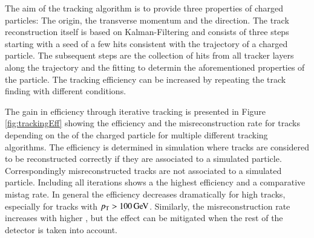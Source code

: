 The aim of the tracking algorithm is to provide three properties of charged particles: The origin, the transverse momentum and the direction.
The track reconstruction itself is based on Kalman-Filtering \cite{Adam:934067} and consists of three steps starting with a seed of a few hits consistent with the trajectory of a charged particle.
The subsequent steps are the collection of hits from all tracker layers along the trajectory and the fitting to determin the aforementioned properties of the particle.
The tracking efficiency can be increased by repeating the track finding with different conditions.

The gain in efficiency through iterative tracking is presented in Figure \ref{fig:trackingEff} showing the efficiency and the misreconstruction rate for tracks depending on the \pt of the charged particle for 
multiple different tracking algorithms. The efficiency is determined in simulation where tracks are considered to be reconstructed correctly if they are associated to a simulated particle. Correspondingly 
misreconstructed tracks are not associated to a simulated particle. 
Including all iterations shows a the highest efficiency and a comparative mistag rate. In general the efficiency decreases dramatically for high \pt tracks, especially for tracks with $p_{\mathrm{T}} > 100 \,\text{Ge\hspace{-.08em}V}$.
Similarly, the misreconstruction rate increases with higher \pt, but the effect can be mitigated when the rest of the detector is taken into account.

